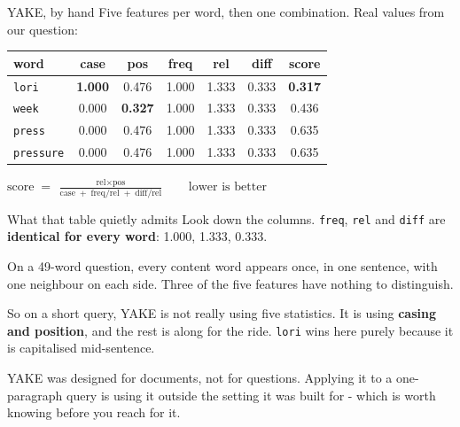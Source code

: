 \documentclass[aspectratio=169]{beamer}
\newcommand{\trapbox}[1]{%
  \begin{tcolorbox}[colback=armred!8, colframe=armred, boxrule=0.6pt, arc=2pt]
  #1
  \end{tcolorbox}}
\begin{document}
\begin{frame}{YAKE, by hand}
  \vspace{0.4em}
  Five features per word, then one combination. Real values from our question:

  \vspace{0.5em}
  \begin{center}
  \small
  \begin{tabular}{lccccc|c}
    \toprule
    \textbf{word} & \textbf{case} & \textbf{pos} & \textbf{freq} & \textbf{rel} &
    \textbf{diff} & \textbf{score} \\
    \midrule
    \texttt{lori}     & \textbf{1.000} & 0.476 & 1.000 & 1.333 & 0.333 & \textbf{0.317} \\
    \texttt{week}     & 0.000 & \textbf{0.327} & 1.000 & 1.333 & 0.333 & 0.436 \\
    \texttt{press}    & 0.000 & 0.476 & 1.000 & 1.333 & 0.333 & 0.635 \\
    \texttt{pressure} & 0.000 & 0.476 & 1.000 & 1.333 & 0.333 & 0.635 \\
    \bottomrule
  \end{tabular}
  \end{center}

  \vspace{0.6em}
  \begin{center}
    $\displaystyle \text{score} \;=\;
      \frac{\text{rel} \times \text{pos}}
           {\text{case} \;+\; \text{freq}/\text{rel} \;+\; \text{diff}/\text{rel}}
      \qquad \text{lower is better}$
  \end{center}
\end{frame}

\begin{frame}{What that table quietly admits}
  \vspace{0.8em}
  Look down the columns. \texttt{freq}, \texttt{rel} and \texttt{diff} are
  \textbf{identical for every word}: 1.000, 1.333, 0.333.

  \vspace{0.9em}
  On a 49-word question, every content word appears once, in one sentence, with one
  neighbour on each side. Three of the five features have nothing to distinguish.

  \vspace{0.9em}
  \trapbox{So on a short query, YAKE is not really using five statistics. It is using
  \textbf{casing and position}, and the rest is along for the ride. \texttt{lori} wins here
  purely because it is capitalised mid-sentence.}

  \vspace{0.6em}
  {\small\color{gray}YAKE was designed for documents, not for questions. Applying it to a
  one-paragraph query is using it outside the setting it was built for - which is worth
  knowing before you reach for it.}
\end{frame}
\end{document}
